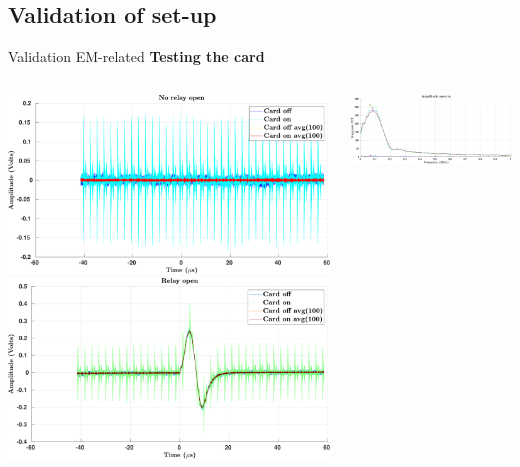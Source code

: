 \documentclass[utf8]{beamer} \usetheme{lfcr} %
\begin{document}
\subsection{Validation of set-up}
\begin{frame}{Validation}
  {EM-related}
  \textbf{Testing the card}

  \begin{columns}
    \begin{column}{0.5\textwidth}
      \includegraphics[width=\textwidth]{Before_HFnoise_norelayopen.pdf}
      \includegraphics[width=\textwidth]{Before_HFnoise_relayopen.pdf}
    \end{column}
    \begin{column}{0.5\textwidth}
      \includegraphics[width=\textwidth]{Before_HFnoise_ampspec1.pdf}

\end{column}
\end{columns}
\end{frame}
\end{document}
